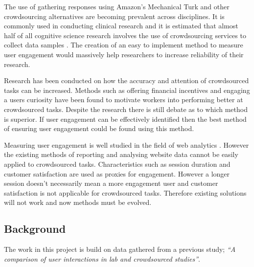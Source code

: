 \documentclass{article}
\begin{document}
The use of gathering responses using Amazon's Mechanical Turk and other crowdsourcing alternatives are becoming prevalent across disciplines.
It is commonly used in conducting clinical research \cite{chandler2016conducting} and it is estimated that almost half of all cognitive science research involves the use of crowdsourcing services to collect data samples \cite{stewart2017crowdsourcing}.
The creation of an easy to implement method to measure user engagement would massively help researchers to increase reliability of their research.

Research has been conducted on how the accuracy and attention of crowdsourced tasks can be increased.
Methods such as offering financial incentives \cite{ho2015incentivizing} and engaging a users curiosity \cite{law2016curiosity} have been found to motivate workers into performing better at crowdsourced tasks.
Despite the research there is still debate as to which method is superior.
If user engagement can be effectively identified then the best method of ensuring user engagement could be found using this method.


Measuring user engagement is well studied in the field of web analytics \cite{peterson2008measuring}.
However the existing methods of reporting and analysing website data cannot be easily applied to crowdsourced tasks.    
Characteristics such as session duration and customer satisfaction are used as proxies for engagement.
However a longer session doesn't necessarily mean a more engagement user and customer satisfaction is not applicable for crowdsourced tasks.
Therefore existing solutions will not work and now methods must be evolved.


\subsection{Background}


The work in this project is build on data gathered from a previous study;
\textit{``A comparison of user interactions in lab and crowdsourced
studies''}\cite{gruber2017thesis}.
\end{document}
